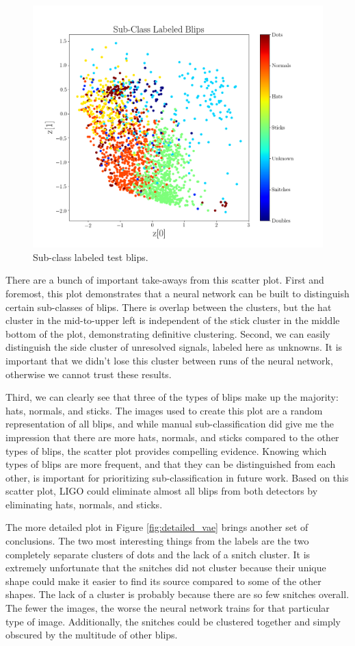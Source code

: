 \documentclass[a4paper]{article}
\begin{document}
\begin{figure}[h!]
	\centering
	\includegraphics[width=.8\linewidth]{vae_test_labeled4}
	\caption{Sub-class labeled test blips.}
	\label{fig:final_vae}
\end{figure}

There are a bunch of important take-aways from this scatter plot. First and foremost, this plot demonstrates that a neural network can be built to distinguish certain sub-classes of blips. There is overlap between the clusters, but the hat cluster in the mid-to-upper left is independent of the stick cluster in the middle bottom of the plot, demonstrating definitive clustering. Second, we can easily distinguish the side cluster of unresolved signals, labeled here as unknowns. It is important that we didn't lose this cluster between runs of the neural network, otherwise we cannot trust these results. 

Third, we can clearly see that three of the types of blips make up the majority: hats, normals, and sticks. The images used to create this plot are a random representation of all blips, and while manual sub-classification did give me the impression that there are more hats, normals, and sticks compared to the other types of blips, the scatter plot provides compelling evidence. Knowing which types of blips are more frequent, and that they can be distinguished from each other, is important for prioritizing sub-classification in future work. Based on this scatter plot, LIGO could eliminate almost all blips from both detectors by eliminating hats, normals, and sticks. 

The more detailed plot in Figure \ref{fig:detailed_vae} brings another set of conclusions. The two most interesting things from the labels are the two completely separate clusters of dots and the lack of a snitch cluster. It is extremely unfortunate that the snitches did not cluster because their unique shape could make it easier to find its source compared to some of the other shapes. The lack of a cluster is probably because there are so few snitches overall. The fewer the images, the worse the neural network trains for that particular type of image. Additionally, the snitches could be clustered together and simply obscured by the multitude of other blips. 
\end{document}
